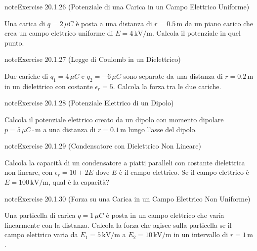 \documentclass[letterpaper,10pt,italian]{jupyterBook}
\begin{document}
\begin{sphinxadmonition}{note}{Exercise 20.1.26 (Potenziale di una Carica in un Campo Elettrico Uniforme)}



\sphinxAtStartPar
Una carica di \(q = 2 \, \mu C\) è posta a una distanza di \(r = 0.5 \, \text{m}\) da un piano carico che crea un campo elettrico uniforme di \(E = 4 \, \text{kV/m}\). Calcola il potenziale in quel punto.
\end{sphinxadmonition}
 \label{exercise:ch/electromagnetism/electrostatics-problems-exercise-26}

\begin{sphinxadmonition}{note}{Exercise 20.1.27 (Legge di Coulomb in un Dielettrico)}



\sphinxAtStartPar
Due cariche di \(q_1 = 4 \, \mu C\) e \(q_2 = -6 \, \mu C\) sono separate da una distanza di \(r = 0.2 \, \text{m}\) in un dielettrico con costante \(\epsilon_r = 5\). Calcola la forza tra le due cariche.
\end{sphinxadmonition}
 \label{exercise:ch/electromagnetism/electrostatics-problems-exercise-27}

\begin{sphinxadmonition}{note}{Exercise 20.1.28 (Potenziale Elettrico di un Dipolo)}



\sphinxAtStartPar
Calcola il potenziale elettrico creato da un dipolo con momento dipolare \(p = 5 \, \mu C \cdot \text{m}\) a una distanza di \(r = 0.1 \, \text{m}\) lungo l’asse del dipolo.
\end{sphinxadmonition}
 \label{exercise:ch/electromagnetism/electrostatics-problems-exercise-28}

\begin{sphinxadmonition}{note}{Exercise 20.1.29 (Condensatore con Dielettrico Non Lineare)}



\sphinxAtStartPar
Calcola la capacità di un condensatore a piatti paralleli con costante dielettrica non lineare, con \(\epsilon_r = 10 + 2E\) dove \(E\) è il campo elettrico. Se il campo elettrico è \(E = 100 \, \text{kV/m}\), qual è la capacità?
\end{sphinxadmonition}
 \label{exercise:ch/electromagnetism/electrostatics-problems-exercise-29}

\begin{sphinxadmonition}{note}{Exercise 20.1.30 (Forza su una Carica in un Campo Elettrico Non Uniforme)}



\sphinxAtStartPar
Una particella di carica \(q = 1 \, \mu C\) è posta in un campo elettrico che varia linearmente con la distanza. Calcola la forza che agisce sulla particella se il campo elettrico varia da \(E_1 = 5 \, \text{kV/m}\) a \(E_2 = 10 \, \text{kV/m}\) in un intervallo di \(r = 1 \, \text{m}\).
\end{sphinxadmonition}
 \label{exercise:ch/electromagnetism/electrostatics-problems-exercise-30}
\end{document}
